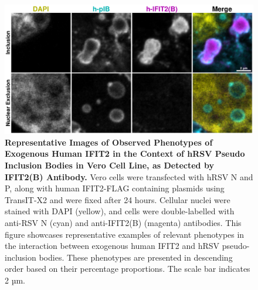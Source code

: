 \begin{figure}
    \centering
    \includegraphics[width=1\linewidth]{09. Chapter 4/Figs/01. pIB/03. IFIT2/04. IFIT2-FLAG/02. IFIT2B/03. i2b-hi2f-hnhp.pdf}
    \caption[Representative Images of Observed Phenotypes of Exogenous Human IFIT2 in the Context of hRSV Pseudo Inclusion Bodies in Vero Cell Line, as Detected by IFIT2(B) Antibody.]{\textbf{Representative Images of Observed Phenotypes of Exogenous Human IFIT2 in the Context of hRSV Pseudo Inclusion Bodies in Vero Cell Line, as Detected by IFIT2(B) Antibody.} Vero cells were transfected with hRSV N and P, along with human IFIT2-FLAG containing plasmids using TransIT-X2 and were fixed after 24 hours. Cellular nuclei were stained with DAPI (yellow), and cells were double-labelled with anti-RSV N (cyan) and anti-IFIT2(B) (magenta) antibodies. This figure showcases representative examples of relevant phenotypes in the interaction between exogenous human IFIT2 and hRSV pseudo-inclusion bodies. These phenotypes are presented in descending order based on their percentage proportions. The scale bar indicates 2 µm.}
    \label{fig:Representative Images of Observed Phenotypes of Exogenous Human IFIT2 in the Context of hRSV Pseudo Inclusion Bodies in Vero Cell Line, as Detected by IFIT2(B) Antibody}
\end{figure}

